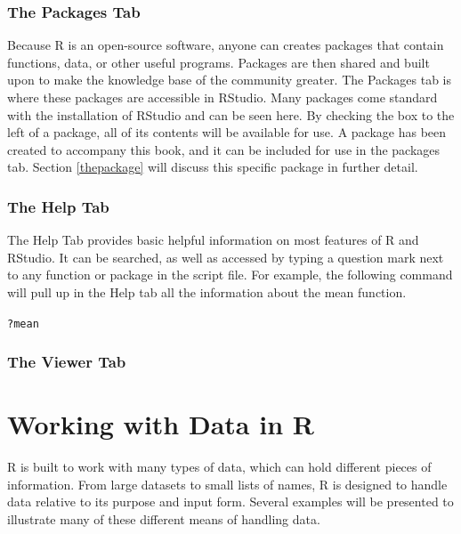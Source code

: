 \documentclass{report}\usepackage[]{graphicx}\usepackage[]{color}
\makeatletter
\newcommand{\hlopt}[1]{\textcolor[rgb]{0,0,0}{#1}}%
\newcommand{\hlstd}[1]{\textcolor[rgb]{0.345,0.345,0.345}{#1}}%
\newenvironment{kframe}{%
 \def\at@end@of@kframe{}%
 \ifinner\ifhmode%
  \def\at@end@of@kframe{\end{minipage}}%
  \begin{minipage}{\columnwidth}%
 \fi\fi%
 \def\FrameCommand##1{\hskip\@totalleftmargin \hskip-\fboxsep
 \colorbox{shadecolor}{##1}\hskip-\fboxsep
     \hskip-\linewidth \hskip-\@totalleftmargin \hskip\columnwidth}%
 \MakeFramed {\advance\hsize-\width
   \@totalleftmargin\z@ \linewidth\hsize
   \@setminipage}}%
 {\par\unskip\endMakeFramed%
 \at@end@of@kframe}
\newenvironment{knitrout}{}{} %
\makeatother
\begin{document}
\subsubsection{The Packages Tab}
Because \textsf{R} is an open-source software, anyone can creates packages that contain functions, data, or other useful programs.  Packages are then shared and built upon to make the knowledge base of the community greater.  The Packages tab is where these packages are accessible in \textsf{RStudio}.  Many packages come standard with the installation of \textsf{RStudio} and can be seen here.  By checking the box to the left of a package, all of its contents will be available for use.  A package has been created to accompany this book, and it can be included for use in the packages tab.  Section \ref{thepackage} will discuss this specific package in further detail.  


\subsubsection{The Help Tab}
The Help Tab provides basic helpful information on most features of \textsf{R} and \textsf{RStudio}.  It can be searched, as well as accessed by typing a question mark next to any function or package in the script file.  For example, the following command will pull up in the Help tab all the information about the mean function.
\begin{knitrout}
\color{fgcolor}\begin{kframe}
\begin{alltt}
\hlopt{?}\hlstd{mean}
\end{alltt}
\end{kframe}
\end{knitrout}


\subsubsection{The Viewer Tab}

\section{Working with Data in \textsf{R}} 
\textsf{R} is built to work with many types of data, which can hold different pieces of information.  From large datasets to small lists of names, \textsf{R} is designed to handle data relative to its purpose and input form.  Several examples will be presented to illustrate many of these different means of handling data. %
\end{document}
